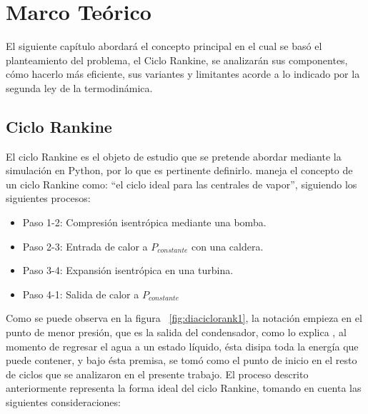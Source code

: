 \pagebreak


\makeatletter
\let\savedchap\@makechapterhead
\def\@makechapterhead{\vspace*{-3cm}\savedchap}
\chapter{Marco Teórico}
\let\@makechapterhead\savedchap
\makeatletter

\vspace{-36pt}

El siguiente capítulo abordará el concepto principal en el cual se basó el planteamiento del problema, el Ciclo Rankine, se analizarán sus componentes, cómo hacerlo más eficiente, sus variantes y limitantes acorde a lo indicado por la segunda ley de la termodinámica.

\vspace{-32pt}

\section{Ciclo Rankine}

\vspace{-12pt}

El ciclo Rankine es el objeto de estudio que se pretende abordar mediante la simulación en Python, por lo que es pertinente definirlo. \textcite{ccengel2006termodinamica} maneja el concepto de un ciclo Rankine como: ``el ciclo ideal para las centrales de vapor'', siguiendo los siguientes procesos:

\begin{itemize}
    \item Paso 1-2: Compresión isentrópica mediante una bomba.
    \item Paso 2-3: Entrada de calor a \( P_{constante} \) con una caldera.
    \item Paso 3-4: Expansión isentrópica en una turbina.
    \item Paso 4-1: Salida de calor a \( P_{constante} \) 
\end{itemize}

Como se puede observa en la figura ~\ref{fig:diaciclorank1},  la notación empieza en el punto de menor presión, que es la salida del condensador, como lo explica \textcite{burghardt1984ingenieria}, al momento de regresar el agua a un estado líquido, ésta disipa toda la energía que puede contener, y bajo ésta premisa, se tomó como el punto de inicio en el resto de ciclos que se analizaron en el presente trabajo. El proceso descrito anteriormente representa la forma ideal del ciclo Rankine, tomando en cuenta las siguientes consideraciones:

